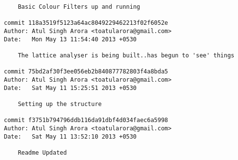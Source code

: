 \begin{lstlisting}
    Basic Colour Filters up and running

commit 118a3519f5123a64ac8049229462213f02f6052e
Author: Atul Singh Arora <toatularora@gmail.com>
Date:   Mon May 13 11:54:40 2013 +0530

    The lattice analyser is being built..has begun to 'see' things

commit 75bd2af30f3ee056eb2b840877782803f4a8bda5
Author: Atul Singh Arora <toatularora@gmail.com>
Date:   Sat May 11 15:25:51 2013 +0530

    Setting up the structure

commit f3751b794796ddb116da91dbf4d034faec6a5998
Author: Atul Singh Arora <toatularora@gmail.com>
Date:   Sat May 11 13:52:10 2013 +0530

    Readme Updated		
		\end{lstlisting}	